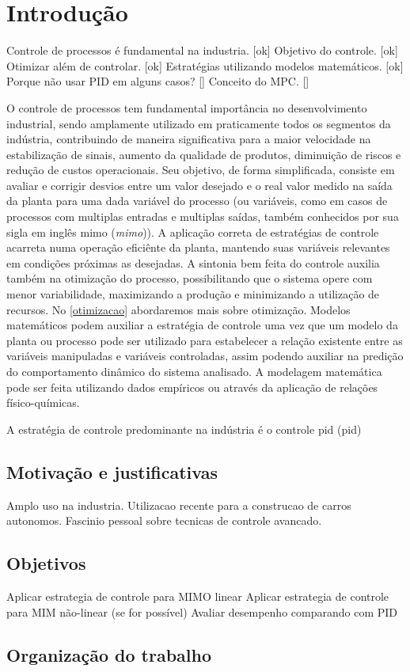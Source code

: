 \chapter{Introdução}

Controle de processos é fundamental na industria.	[ok]
Objetivo do controle.								[ok]
Otimizar além de controlar.							[ok]
Estratégias utilizando modelos matemáticos.			[ok]
Porque não usar PID em alguns casos?				[]
Conceito do MPC.									[]


O controle de processos tem fundamental importância no desenvolvimento industrial, sendo amplamente utilizado em praticamente todos os segmentos da indústria, contribuindo de maneira significativa para a maior velocidade na estabilização de sinais, aumento da qualidade de produtos, diminuição de riscos e redução de custos operacionais. Seu objetivo, de forma simplificada, consiste em avaliar e corrigir desvios entre um valor desejado e o real valor medido na saída da planta para uma dada variável do processo (ou variáveis, como em casos de processos com multiplas entradas e multiplas saídas, também conhecidos por sua sigla em inglês \acrshort{mimo} (\textit{\acrlong{mimo}})). A aplicação correta de estratégias de controle acarreta numa operação eficiênte da planta, mantendo suas variáveis relevantes em condições próximas as desejadas. A sintonia bem feita do controle auxilia também na otimização do processo, possibilitando que o sistema opere com menor variabilidade, maximizando a produção e minimizando a utilização de recursos. No \autoref{otimizacao} abordaremos mais sobre otimização.
Modelos matemáticos podem auxiliar a estratégia de controle uma vez que um modelo da planta ou processo pode ser utilizado para estabelecer a relação existente entre as variáveis manipuladas e variáveis controladas, assim podendo auxiliar na predição do comportamento dinâmico do sistema analisado. A modelagem matemática pode ser feita utilizando dados empíricos ou através da aplicação de relações físico-químicas.

A estratégia de controle predominante na indústria é o controle \acrshort{pid} (\acrlong{pid})


\section{Motivação e justificativas}

Amplo uso na industria.
Utilizacao recente para a construcao de carros autonomos.
Fascinio pessoal sobre tecnicas de controle avancado.

\section{Objetivos}

Aplicar estrategia de controle para MIMO linear
Aplicar estrategia de controle para MIM não-linear (se for possível)
Avaliar desempenho comparando com PID

\section{Organização do trabalho}